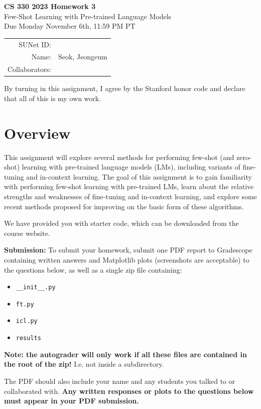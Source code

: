 \documentclass[12pt]{article}
\begin{document}
\begin{center}
{\Large \textbf{CS 330 2023 Homework 3} \\ Few-Shot Learning with Pre-trained Language Models
\\ 
\vspace{0.2cm}
Due Monday November 6th, 11:59 PM PT}

\begin{tabular}{rl}
SUNet ID: &  \\
Name: & Seok, Jeongeum\\
Collaborators: & 
\end{tabular}
\end{center}

By turning in this assignment, I agree by the Stanford honor code and declare that all of this is my own work.

\section*{Overview}
This assignment will explore several methods for performing few-shot (and zero-shot) learning with pre-trained language models (LMs), including variants of fine-tuning and in-context learning. The goal of this assignment is to gain familiarity with performing few-shot learning with pre-trained LMs, learn about the relative strengths and weaknesses of fine-tuning and in-context learning, and explore some recent methods proposed for improving on the basic form of these algorithms.

\noindent We have provided you with starter code, which can be downloaded from the course website.

\textbf{Submission:} To submit your homework, submit one PDF report to Gradescope containing written answers and Matplotlib plots (screenshots are acceptable) to the questions below, as well as a single zip file containing:
\begin{itemize}
    \item \texttt{\_\_init\_\_.py}
    \item \texttt{ft.py}
    \item \texttt{icl.py}
    \item \texttt{results}
\end{itemize}
\textbf{Note: the autograder will only work if all these files are contained in the root of the zip!} I.e. not inside a subdirectory.

 The PDF should also include your name and any students you talked to or collaborated with. \textbf{Any written responses or plots to the questions below must appear in your PDF submission.}
\end{document}
